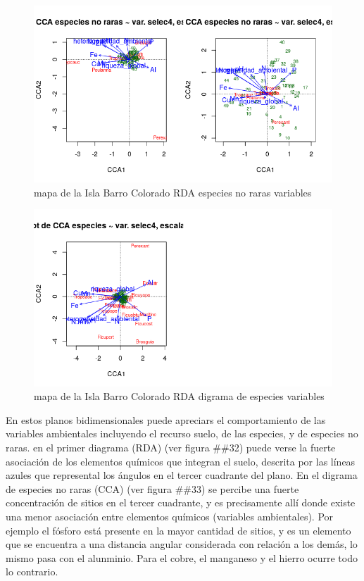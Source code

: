 \documentclass[11pt,]{article}
\begin{document}
\begin{figure}
\centering
\includegraphics[width=1.00000\textwidth]{rda_escalamiento_escala_5.png}
\caption{mapa de la Isla Barro Colorado RDA especies no raras
variables\label{fig:bci_map}}
\end{figure}

\begin{figure}
\centering
\includegraphics[width=1.00000\textwidth]{rda_especies_escala_4.png}
\caption{mapa de la Isla Barro Colorado RDA digrama de especies
variables\label{fig:bci_map}}
\end{figure}

En estos planos bidimensionales puede apreciars el comportamiento de las
variables ambientales incluyendo el recurso suelo, de las especies, y de
especies no raras. en el primer diagrama (RDA) (ver figura \#\#32) puede
verse la fuerte asociación de los elementos químicos que integran el
suelo, descrita por las líneas azules que represental los ángulos en el
tercer cuadrante del plano. En el digrama de especies no raras (CCA)
(ver figura \#\#33) se percibe una fuerte concentración de sitios en el
tercer cuadrante, y es precisamente allí donde existe una menor
asociación entre elementos químicos (variables ambientales). Por ejemplo
el fósforo está presente en la mayor cantidad de sitios, y es un
elemento que se encuentra a una distancia angular considerada con
relación a los demás, lo mismo pasa con el alunminio. Para el cobre, el
manganeso y el hierro ocurre todo lo contrario.
\end{document}
